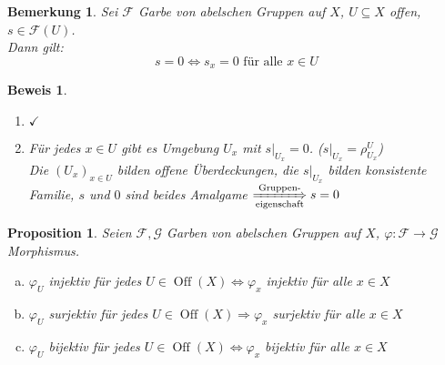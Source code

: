 \documentclass[paper = A4, fontsize=12pt, numbers=noendperiod, chapterprefix=true]{scrbook}
\theoremstyle{break}
\newtheorem{Bem}[Def]{Bemerkung}
\newtheorem{Prop}[Def]{Proposition}
\theoremstyle{nonumberbreak}
\newtheorem{bew}{Beweis}
\theoremstyle{nonumberplain}
\newcommand{\quot}[1]{\textrm{\glqq}{#1}\textrm{\grqq}}
\newenvironment{twosidedproof}{\begin{enumerate}[\quot{$\Rightarrow$}:]}{\end{enumerate}}
\newcommand{\proofforward}{\item[\quot{$\Rightarrow$}:]}
\newcommand{\proofreverse}{\item[\quot{$\Leftarrow$}:]}
\DeclareMathOperator{\Off}{Off}
\newcommand{\calF}{\mathcal{F}}
\newcommand{\calG}{\mathcal{G}}
\begin{document}

\begin{Bem}\label{1.7}
Sei $\calF$ Garbe von abelschen Gruppen auf $X$, $U\subseteq X$ offen, $s\in \calF(U)$.\\
Dann gilt:
  \[s=0 \Leftrightarrow s_x = 0 \text{ f\"ur alle } x\in U\]
\end{Bem}

\begin{bew}\begin{twosidedproof}
\proofforward
  $\checkmark$
\proofreverse
  F\"ur jedes $x\in U$ gibt es Umgebung $U_x$ mit $s|_{U_x} = 0$. ($s|_{U_x} = \rho_{U_x}^U$)\\
  Die $(U_x)_{x\in U}$ bilden offene \"Uberdeckungen, die $s|_{U_x}$ bilden konsistente Familie, $s$ und $0$ sind beides Amalgame $\xRightarrow[\text{eigenschaft}]{\text{Gruppen-}} s= 0$
\end{twosidedproof}\end{bew}

\begin{Prop}\label{1.8}
Seien $\calF, \calG$ Garben von abelschen Gruppen auf $X$, $\varphi: \calF \to \calG$ Morphismus.
\begin{enumerate}[a)]
\item\label{1.8a}
  $\varphi_U$ injektiv f\"ur jedes $U\in \Off(X) \Leftrightarrow \varphi_x$ injektiv f\"ur alle $x\in X$
\item
  $\varphi_U$ surjektiv f\"ur jedes $U\in \Off(X) \Rightarrow \varphi_x$ surjektiv f\"ur alle $x\in X$
\item
  $\varphi_U$ bijektiv f\"ur jedes $U\in \Off(X) \Leftrightarrow \varphi_x$ bijektiv f\"ur alle $x\in X$
\end{enumerate}\end{Prop}
\end{document}
